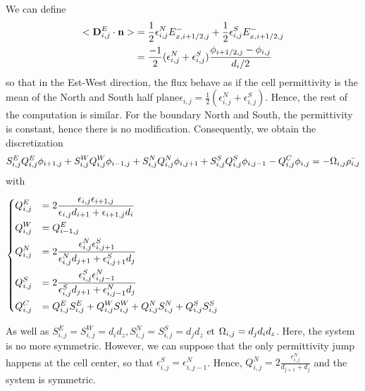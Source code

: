     We can define
    \begin{align}
    <{\mathbf D}^E_{i,j} \cdot {\mathbf n} >&= \frac{1}{2} \epsilon_{i,j}^N E_{x, i+1/2,j}^- + \frac{1}{2} \epsilon_{i,j}^S E_{x, i+1/2,j}^-\\
     &= \frac{-1}{2} (\epsilon_{i,j}^N + \epsilon_{i,j}^S) \frac{\phi_{i+1/2,j} - \phi_{i,j}}{d_i/2}
     \label{eq-flux}
    \end{align}
    so that in the Est-West direction, the flux behave as if the cell permittivity is the mean of the North and South half plane$\epsilon_{i,j} = \frac{1}{2} (\epsilon_{i,j}^N + \epsilon_{i,j}^S)$.
    Hence, the rest of the computation is similar.
    For the boundary North and South, the permittivity is constant, hence there is no modification.
    Consequently, we obtain the discretization
    \begin{equation}
    S^E_{i,j} Q^E_{i,j} \phi_{i+1,j} + S^W_{i,j} Q^W_{i,j} \phi_{i-1,j} + S^N_{i,j} Q^N_{i,j} \phi_{i,j+1} + S^S_{i,j} Q^S_{i,j} \phi_{i,j-1} - Q^C_{i,j} \phi_{i,j} = - \Omega_{i,j} \bar{\rho_{i,j}}
    \label{eq-descretPoissoncentered}
    \end{equation}
    with
    \begin{center}
     $\begin{dcases}
     Q^E_{i,j} &= 2\frac{\epsilon_{i,j} \epsilon_{i+1,j}}{\epsilon_{i,j} d_{i+1} + \epsilon_{i+1,j} d_i} \\
     Q^W_{i,j} &= Q^E_{i-1,j} \\
     Q^N_{i,j} &= 2\frac{\epsilon_{i,j}^N \epsilon_{i,j+1}^S}{\epsilon_{i,j}^N d_{j+1} + \epsilon_{i,j+1}^S d_{j}}\\
     Q^S_{i,j} &= 2\frac{\epsilon_{i,j}^S \epsilon_{i,j-1}^N}{\epsilon_{i,j}^S d_{j+1} + \epsilon_{i,j-1}^N d_{j}} \\
     Q^C_{i,j} &= Q^E_{i,j}S^E_{i,j}+Q^W_{i,j}S^W_{i,j}+Q^N_{i,j}S^N_{i,j}+Q^S_{i,j}S^S_{i,j}
     \end{dcases}$
    \end{center}

    As well as $S^E_{i,j} = S^W_{i,j} =d_id_z, S^N_{i,j} = S^S_{i,j}= d_jd_z$ et $\Omega_{i,j} = d_jd_id_z$.
    Here, the system is no more symmetric.
    However, we can suppose that the only permittivity jump happens at the cell center, so that  $\epsilon_{i,j}^S = \epsilon_{i,j-1}^N$.
    Hence, $Q^N_{i,j} = 2\frac{\epsilon_{i,j}^N}{ d_{j+1} + d_{j}}$ and the system is symmetric.

